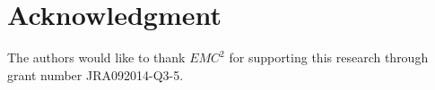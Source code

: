 \documentclass[conference]{IEEEtran}
\begin{document}
%









\section*{Acknowledgment}
The authors would like to thank $EMC^2$ for supporting this research through grant number JRA092014-Q3-5.
%
%



\nocite{Rabiner,SS97a,Kawamoto,Diane,Klopfert,Ghahramani,Felice,Shen,taban,Albert,wijaya2014consumer,Zhang,Daneshi,bassi,samuel,Falvo,Bakirtzis,Chen,Chow,DisaggregationHSMM,KolterJ12,KolterF11,BLTJ:BLTJ21650,Heinzelman00energy,Taylor,NYAS:NYAS5921,
Wijaya,5620917,1626400,mckerracher,hinton2000,aistats,fhmm,andrew}

\end{document}
